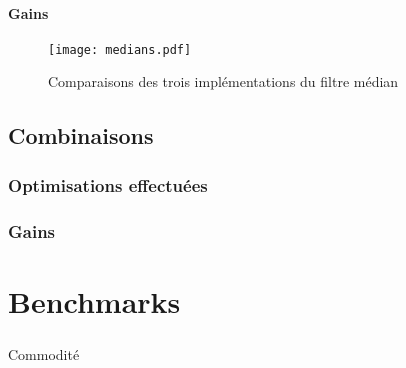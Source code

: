 \documentclass{report}
\begin{document}
\subsubsection{Gains}

\begin{figure}[H]
	\centering
	\texttt{[image: medians.pdf]}%
	\label{fig:medians}
	\caption{Comparaisons des trois implémentations du filtre médian}
\end{figure}

\paragraph{}

\section{Combinaisons}

\subsection{Optimisations effectuées}

\paragraph{}

\subsection{Gains}

\paragraph{}

\chapter{Benchmarks}

\paragraph{} Commodité
\end{document}

